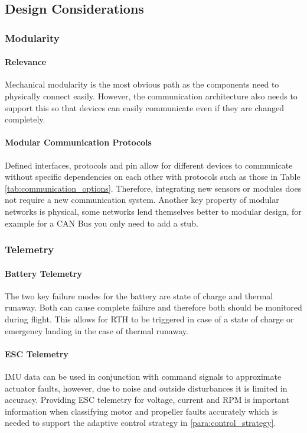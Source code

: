 \subsection{Design Considerations}\label{sub_sub_section:tgt_intra_comms_design_considerations}

\subsubsection{Modularity}\label{sub_sub_section:tgt_modularity}
\paragraph{Relevance}
Mechanical modularity is the most obvious path as the components need to physically connect easily. However, the communication architecture also needs to support this so that devices can easily communicate even if they are changed completely.
\paragraph{Modular Communication Protocols}
Defined interfaces, protocols and pin allow for different devices to communicate without specific dependencies on each other with protocols such as those in Table \ref{tab:communication_options}. Therefore, integrating new sensors or modules does not require a new communication system. Another key property of modular networks is physical, some networks lend themselves better to modular design, for example for a \gls{CAN} Bus you only need to add a stub.

\subsubsection{Telemetry}\label{sub_sub_section:tgt_telemetry}
\paragraph{Battery Telemetry}
The two key failure modes for the battery are state of charge and thermal runaway. Both can cause complete failure and therefore both should be monitored during flight. This allows for \gls{RTH} to be triggered in case of a state of charge or emergency landing in the case of thermal runaway.
\paragraph{\gls{ESC} Telemetry}
\gls{IMU} data can be used in conjunction with command signals to approximate actuator faults, however, due to noise and outside disturbances it is limited in accuracy. Providing \gls{ESC} telemetry for voltage, current and \gls{RPM} is important information when classifying motor and propeller faults accurately which is needed to support the adaptive control strategy in \ref{para:control_strategy}.   

